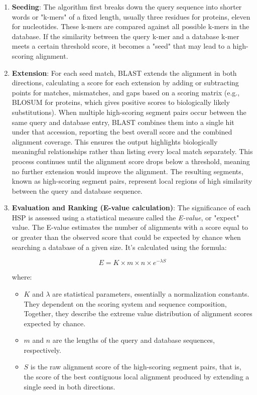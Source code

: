 \begin{enumerate}
    \item \textbf{Seeding}: The algorithm first breaks down the query sequence into shorter words or "k-mers" of a fixed length, usually three residues for proteins, eleven for nucleotides. These k-mers are compared against all possible k-mers in the database.
    If the similarity between the query k-mer and a database k-mer meets a certain threshold score, it becomes a "seed" that may lead to a high-scoring alignment.
    
    \item \textbf{Extension}: For each seed match, BLAST extends the alignment in both directions, calculating a score for each extension by adding or subtracting points for matches, mismatches, and gaps based on a scoring matrix (e.g., BLOSUM for proteins, which gives positive scores to biologically likely substitutions). When multiple high-scoring segment pairs occur between the same query and database entry, BLAST combines them into a single hit under that accession, reporting the best overall score and the combined alignment coverage. This ensures the output highlights biologically meaningful relationships rather than listing every local match separately. This process continues until the alignment score drops below a threshold, meaning no further extension would improve the alignment. The resulting segments, known as high-scoring segment pairs, represent local regions of high similarity between the query and database sequence.
    
    \item \textbf{Evaluation and Ranking (E-value calculation)}: The significance of each HSP is assessed using a statistical measure called the \textit{E-value}, or "expect" value. The E-value estimates the number of alignments with a score equal to or greater than the observed score that could be expected by chance when searching a database of a given size. It’s calculated using the formula:

    \[
    E = K \times m \times n \times e^{-\lambda S}
    \]

    where:
    \begin{itemize}
        \item \( K \) and \( \lambda \) are statistical parameters, essentially a normalization constants. They dependent on the scoring system and sequence composition, Together, they describe the extreme value distribution of alignment scores expected by chance.
        \item \( m \) and \( n \) are the lengths of the query and database sequences, respectively.
        \item \( S \) is the raw alignment score of the high-scoring segment pairs, that is, the score of the best contiguous local alignment produced by extending a single seed in both directions.
    \end{itemize}


\end{enumerate}
